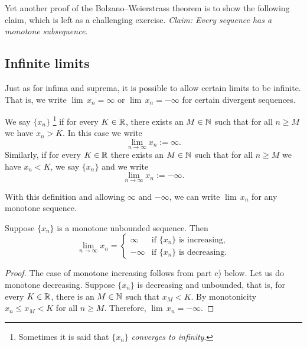 Yet another proof of the Bolzano--Weierstrass theorem is to show the
following claim,
which is left as a challenging exercise.
\emph{Claim: Every sequence has a monotone subsequence}.

\subsection{Infinite limits}

Just as for infima and suprema, it is possible to allow certain
limits to be infinite.  That is, we write $\lim \, x_n = \infty$ or
$\lim \, x_n = -\infty$ for certain divergent sequences.

\begin{defn}
We say
$\{ x_n \}$ \emph{}%
\footnote{Sometimes it is said that $\{ x_n \}$ \emph{converges to infinity}.}
if for every $K \in
{\mathbb{R}}$, there exists an $M \in {\mathbb{N}}$ such that for all $n \geq M$ we have $x_n >
K$.  In this case we write
\begin{equation*}
\lim_{n \to \infty} x_n := \infty .  
\end{equation*}
Similarly,
if for every $K \in {\mathbb{R}}$ there exists an $M \in {\mathbb{N}}$ such that
for all $n \geq M$ we have $x_n < K$, we say $\{ x_n \}$
\emph{} and we write
\begin{equation*}
\lim_{n \to \infty} x_n := -\infty .  
\end{equation*}
\end{defn}

With this definition and allowing $\infty$ and $-\infty$,
we can write $\lim \, x_n$ for any monotone sequence.

\begin{prop} \label{prop:unboundedmonotone}
Suppose $\{ x_n \}$ is a monotone unbounded sequence.  Then
\begin{equation*}
\lim_{n \to \infty} x_n =
\begin{cases}
\infty  & \text{if } \{ x_n \} \text{ is increasing,} \\
-\infty & \text{if } \{ x_n \} \text{ is decreasing.}
\end{cases}
\end{equation*}
\end{prop}

\begin{proof}
The case of monotone increasing follows from
 part c) below.  Let us do
monotone decreasing.  Suppose $\{x_n\}$ is decreasing and unbounded,
that is,
for every $K \in {\mathbb{R}}$, there is an $M \in {\mathbb{N}}$ such that $x_M < K$.
By monotonicity $x_n \leq x_M < K$ for all $n \geq M$.   Therefore,
$\lim \, x_n = -\infty$.
\end{proof}

